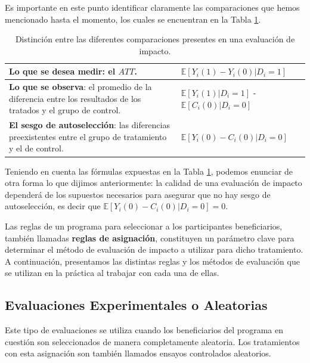 \documentclass[../../main.tex]{subfiles}
\begin{document}
\bigskip
Es importante en este punto identificar claramente las comparaciones que hemos
mencionado hasta el momento, los cuales se encuentran en la Tabla \ref{tab:distinciones}.
\begin{table}[h!]
    \centering
    \begin{tabular}{p{7cm}m{7cm}}  %
        \hline
        \textbf{Lo que se desea medir}: el \(ATT\). & \(\mathbb{E} \left[Y_i(1)-Y_i(0)|D_i=1\right]\) \\
        \hline
        \textbf{Lo que se observa}: el promedio de la diferencia entre los resultados de
        los tratados y el grupo de control. & \(\mathbb{E} \left[Y_i(1)|D_i=1\right]\) -
        \(\mathbb{E} \left[C_i(0)|D_i=0\right]\) \\
        \hline
        \textbf{El sesgo de autoselección}: las diferencias preexistentes entre el grupo de
        tratamiento y el de control. & \(\mathbb{E} \left[Y_i(0)-C_i(0)|D_i=0\right]\) \\
        \hline
    \end{tabular}
    \caption{Distinción entre las diferentes comparaciones presentes en una evaluación de impacto.}
    \label{tab:distinciones}
\end{table}

Teniendo en cuenta las fórmulas expuestas en la Tabla \ref{tab:distinciones}, podemos
enunciar de otra forma lo que dijimos anteriormente: la calidad de una evaluación de
impacto dependerá de los supuestos necesarios para asegurar que no hay sesgo de autoselección,
es decir que \(\mathbb{E} \left[Y_i(0)-C_i(0)|D_i=0\right] = 0\).

\bigskip
Las reglas de un programa para seleccionar a los participantes beneficiarios, también
llamadas \textbf{reglas de asignación}, constituyen un parámetro clave para determinar el
método de evaluación de impacto a utilizar para dicho tratamiento. A continuación,
presentamos las distintas reglas y los métodos de evaluación que se utilizan en la
práctica al trabajar con cada una de ellas.

\subsection{Evaluaciones Experimentales o Aleatorias}
Este tipo de evaluaciones se utiliza cuando los beneficiarios del programa en cuestión son
seleccionados de manera completamente aleatoria\footnotemark. Los tratamientos con esta
asignación son también llamados ensayos controlados aleatorios. 
\end{document}
